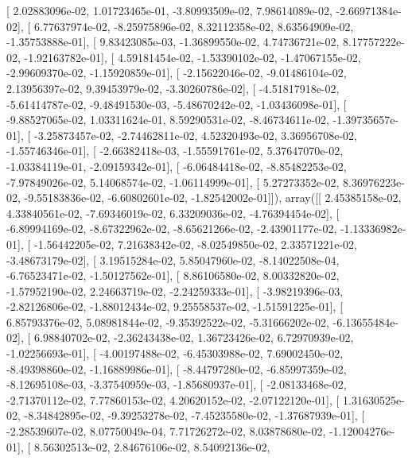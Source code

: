 \documentclass{article}
\begin{document}
       [  2.02883096e-02,   1.01723465e-01,  -3.80993509e-02,
          7.98614089e-02,  -2.66971384e-02],
       [  6.77637974e-02,  -8.25975896e-02,   8.32112358e-02,
          8.63564909e-02,  -1.35753888e-01],
       [  9.83423085e-03,  -1.36899550e-02,   4.74736721e-02,
          8.17757222e-02,  -1.92163782e-01],
       [  4.59181454e-02,  -1.53390102e-02,  -1.47067155e-02,
         -2.99609370e-02,  -1.15920859e-01],
       [ -2.15622046e-02,  -9.01486104e-02,   2.13956397e-02,
          9.39453979e-02,  -3.30260786e-02],
       [ -4.51817918e-02,  -5.61414787e-02,  -9.48491530e-03,
         -5.48670242e-02,  -1.03436098e-01],
       [ -9.88527065e-02,   1.03311624e-01,   8.59290531e-02,
         -8.46734611e-02,  -1.39735657e-01],
       [ -3.25873457e-02,  -2.74462811e-02,   4.52320493e-02,
          3.36956708e-02,  -1.55746346e-01],
       [ -2.66382418e-03,  -1.55591761e-02,   5.37647070e-02,
         -1.03384119e-01,  -2.09159342e-01],
       [ -6.06484418e-02,  -8.85482253e-02,  -7.97849026e-02,
          5.14068574e-02,  -1.06114999e-01],
       [  5.27273352e-02,   8.36976223e-02,  -9.55183836e-02,
         -6.60802601e-02,  -1.82542002e-01]]), array([[  2.45385158e-02,   4.33840561e-02,  -7.69346019e-02,
          6.33209036e-02,  -4.76394454e-02],
       [ -6.89994169e-02,  -8.67322962e-02,  -8.65621266e-02,
         -2.43901177e-02,  -1.13336982e-01],
       [ -1.56442205e-02,   7.21638342e-02,  -8.02549850e-02,
          2.33571221e-02,  -3.48673179e-02],
       [  3.19515284e-02,   5.85047960e-02,  -8.14022508e-04,
         -6.76523471e-02,  -1.50127562e-01],
       [  8.86106580e-02,   8.00332820e-02,  -1.57952190e-02,
          2.24663719e-02,  -2.24259333e-01],
       [ -3.98219396e-03,  -2.82126806e-02,  -1.88012434e-02,
          9.25558537e-02,  -1.51591225e-01],
       [  6.85793376e-02,   5.08981844e-02,  -9.35392522e-02,
         -5.31666202e-02,  -6.13655484e-02],
       [  6.98840702e-02,  -2.36243438e-02,   1.36723426e-02,
          6.72970939e-02,  -1.02256693e-01],
       [ -4.00197488e-02,  -6.45303988e-02,   7.69002450e-02,
         -8.49398860e-02,  -1.16889986e-01],
       [ -8.44797280e-02,  -6.85997359e-02,  -8.12695108e-03,
         -3.37540959e-03,  -1.85680937e-01],
       [ -2.08133468e-02,  -2.71370112e-02,   7.77860153e-02,
          4.20620152e-02,  -2.07122120e-01],
       [  1.31630525e-02,  -8.34842895e-02,  -9.39253278e-02,
         -7.45235580e-02,  -1.37687939e-01],
       [ -2.28539607e-02,   8.07750049e-04,   7.71726272e-02,
          8.03878680e-02,  -1.12004276e-01],
       [  8.56302513e-02,   2.84676106e-02,   8.54092136e-02,
\end{document}
